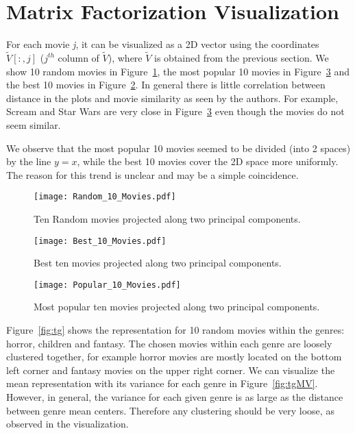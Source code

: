 \section{Matrix Factorization Visualization}

For each movie \textit{j}, it can be visualized as a 2D vector using the coordinates $\tilde{V}[:,j]$ ($j^{th}$ column of $\tilde{V}$), where $\tilde{V}$ is obtained from the previous section. We show 10 random movies in Figure~\ref{fig:tenRandom}, the most popular 10 movies in Figure~\ref{fig:tenMostPopular} and the best 10 movies in Figure~\ref{fig:tenBest}. In general there is little correlation between distance in the plots and movie similarity as seen by the authors. For example, Scream and Star Wars are very close in Figure~\ref{fig:tenMostPopular} even though the movies do not seem similar. 

We observe that the most popular 10 movies seemed to be divided (into 2 spaces) by the line $y = x$, while the best 10 movies cover the 2D space more uniformly. The reason for this trend is unclear and may be a simple coincidence.  

\begin{figure}[hptb]
\centering
\texttt{[image: Random\_10\_Movies.pdf]}
 \caption{Ten Random movies projected along two principal components.}
\label{fig:tenRandom}
\end{figure}


\begin{figure}[hptb]
\centering
\texttt{[image: Best\_10\_Movies.pdf]}
 \caption{Best ten movies projected along two principal components.}
\label{fig:tenBest}
\end{figure}


\begin{figure}[hptb]
\centering
\texttt{[image: Popular\_10\_Movies.pdf]}
 \caption{Most popular ten movies projected along two principal components.}
\label{fig:tenMostPopular}
\end{figure}

Figure~\ref{fig:tg} shows the representation for 10 random movies within the genres: horror, children and fantasy. The chosen movies within each genre are loosely clustered together, for example horror movies are mostly located on the bottom left corner and fantasy movies on the upper right corner. We can visualize the mean representation with its variance for each genre in Figure~\ref{fig:tgMV}. However, in general, the variance for each given genre is as large as the distance between genre mean centers. Therefore any clustering should be very loose, as observed in the visualization.

